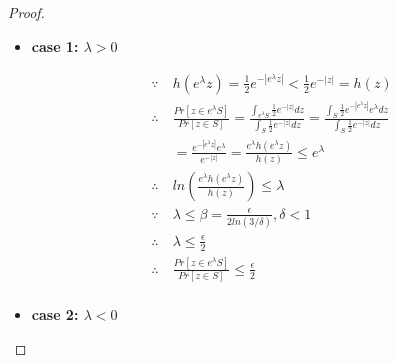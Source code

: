 \documentclass{article}
\begin{document}
\begin{proof}

\begin{itemize}
	\item \textbf{case 1: $\lambda > 0$}

	\begin{equation*}
	\begin{split}
	\because\ 		& 	h(e^{\lambda} z) =  \frac{1}{2} e^{-|e^{\lambda} z|} < \frac{1}{2} e^{-|z|} = h(z)\\
	\therefore\		& 	\frac{Pr[z \in e^{\lambda} S]}{Pr[z \in S]} 
						= \frac
						{\int_{e^{\lambda} S}{} \frac{1}{2}e^{-|z|} dz}
						{\int_{S}{} \frac{1}{2}e^{-|z|} dz} 
						= \frac
						{\int_{S}{} \frac{1}{2}e^{-|e^{\lambda}z|} e^{\lambda} dz}
						{\int_{S}{} \frac{1}{2}e^{-|z|}dz} \\
					&	= \frac{e^{-|e^{\lambda}z|} e^{\lambda}}{e^{-|z|}}
						= \frac{e^{\lambda} h(e^{\lambda} z)}{h(z)}
						\leq e^{\lambda}\\
	\therefore\		&	ln(\frac{e^{\lambda} h(e^{\lambda} z)}{h(z)})
						\leq \lambda \\
	\because\		&	\lambda \leq \beta = \frac{\epsilon}{2 ln(3 / \delta)}, \delta < 1 \\
	\therefore\		&	\lambda \leq \frac{\epsilon}{2} \\
	\therefore\		&	\frac{Pr[z \in e^{\lambda} S]}{Pr[z \in S]} \leq \frac{\epsilon}{2} \\
	\end{split}
	\end{equation*}

	\item \textbf{case 2: $\lambda < 0$}




\end{itemize}
\end{proof}
\end{document}

